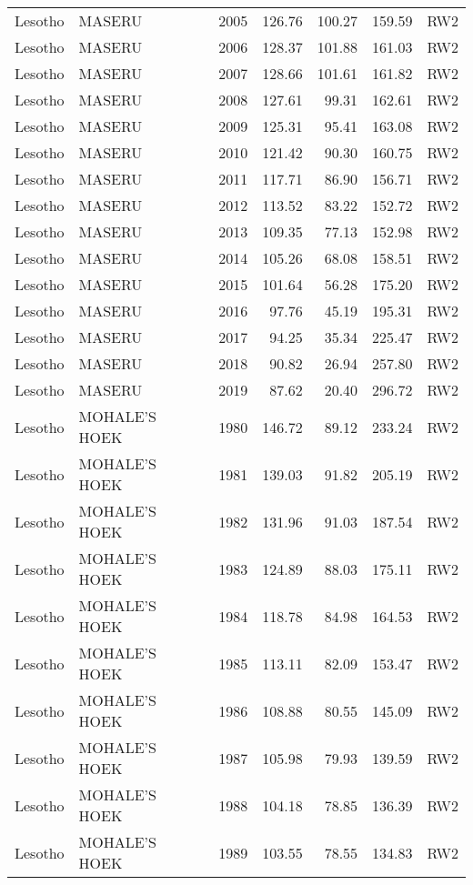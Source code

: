 \begin{longtable}{lllrrrl}
  Lesotho & MASERU & 2005 & 126.76 & 100.27 & 159.59 & RW2 \\ 
  Lesotho & MASERU & 2006 & 128.37 & 101.88 & 161.03 & RW2 \\ 
  Lesotho & MASERU & 2007 & 128.66 & 101.61 & 161.82 & RW2 \\ 
  Lesotho & MASERU & 2008 & 127.61 & 99.31 & 162.61 & RW2 \\ 
  Lesotho & MASERU & 2009 & 125.31 & 95.41 & 163.08 & RW2 \\ 
  Lesotho & MASERU & 2010 & 121.42 & 90.30 & 160.75 & RW2 \\ 
  Lesotho & MASERU & 2011 & 117.71 & 86.90 & 156.71 & RW2 \\ 
  Lesotho & MASERU & 2012 & 113.52 & 83.22 & 152.72 & RW2 \\ 
  Lesotho & MASERU & 2013 & 109.35 & 77.13 & 152.98 & RW2 \\ 
  Lesotho & MASERU & 2014 & 105.26 & 68.08 & 158.51 & RW2 \\ 
  Lesotho & MASERU & 2015 & 101.64 & 56.28 & 175.20 & RW2 \\ 
  Lesotho & MASERU & 2016 & 97.76 & 45.19 & 195.31 & RW2 \\ 
  Lesotho & MASERU & 2017 & 94.25 & 35.34 & 225.47 & RW2 \\ 
  Lesotho & MASERU & 2018 & 90.82 & 26.94 & 257.80 & RW2 \\ 
  Lesotho & MASERU & 2019 & 87.62 & 20.40 & 296.72 & RW2 \\ 
  Lesotho & MOHALE'S HOEK & 1980 & 146.72 & 89.12 & 233.24 & RW2 \\ 
  Lesotho & MOHALE'S HOEK & 1981 & 139.03 & 91.82 & 205.19 & RW2 \\ 
  Lesotho & MOHALE'S HOEK & 1982 & 131.96 & 91.03 & 187.54 & RW2 \\ 
  Lesotho & MOHALE'S HOEK & 1983 & 124.89 & 88.03 & 175.11 & RW2 \\ 
  Lesotho & MOHALE'S HOEK & 1984 & 118.78 & 84.98 & 164.53 & RW2 \\ 
  Lesotho & MOHALE'S HOEK & 1985 & 113.11 & 82.09 & 153.47 & RW2 \\ 
  Lesotho & MOHALE'S HOEK & 1986 & 108.88 & 80.55 & 145.09 & RW2 \\ 
  Lesotho & MOHALE'S HOEK & 1987 & 105.98 & 79.93 & 139.59 & RW2 \\ 
  Lesotho & MOHALE'S HOEK & 1988 & 104.18 & 78.85 & 136.39 & RW2 \\ 
  Lesotho & MOHALE'S HOEK & 1989 & 103.55 & 78.55 & 134.83 & RW2 \\ 

\end{longtable}
